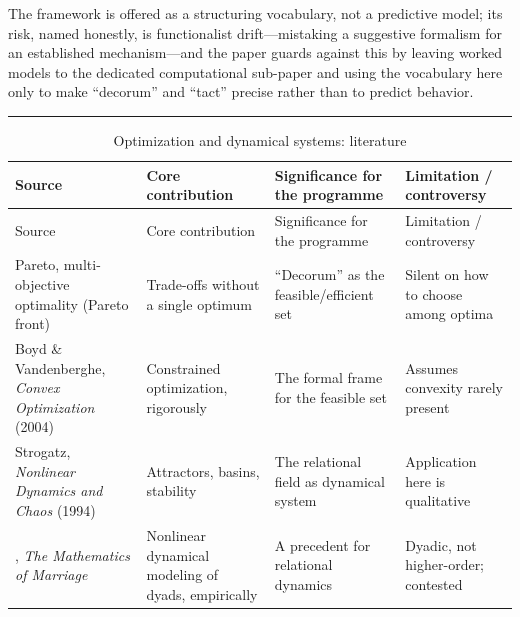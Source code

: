 \documentclass[11pt,a4paper]{article}
\newcommand{\goldrule}{\noindent\textcolor{gold}{\rule{\linewidth}{0.6pt}}\par\vspace{0.4em}}
\begin{document}
The framework is offered as a structuring vocabulary, not a predictive model; its risk, named honestly, is functionalist drift---mistaking a suggestive formalism for an established mechanism---and the paper guards against this by leaving worked models to the dedicated computational sub-paper and using the vocabulary here only to make ``decorum'' and ``tact'' precise rather than to predict behavior.

\goldrule
\footnotesize
\begin{longtable}{Y Y Y Y}
\caption{Optimization and dynamical systems: literature}\label{p07:tab:lit-optim}\\
\toprule
{}
Source & Core contribution & Significance for the programme & Limitation / controversy \\
\midrule
\endfirsthead
{}
Source & Core contribution & Significance for the programme & Limitation / controversy \\
\midrule
\endhead
Pareto, multi-objective optimality (Pareto front) & Trade-offs without a single optimum & ``Decorum'' as the feasible/efficient set & Silent on how to choose among optima \\
Boyd \& Vandenberghe, \emph{Convex Optimization} (2004) & Constrained optimization, rigorously & The formal frame for the feasible set & Assumes convexity rarely present \\
Strogatz, \emph{Nonlinear Dynamics and Chaos} (1994) & Attractors, basins, stability & The relational field as dynamical system & Application here is qualitative \\
\textcite{gottman2002math}, \emph{The Mathematics of Marriage} & Nonlinear dynamical modeling of dyads, empirically & A precedent for relational dynamics & Dyadic, not higher-order; contested \\
\bottomrule
\end{longtable}
\end{document}
